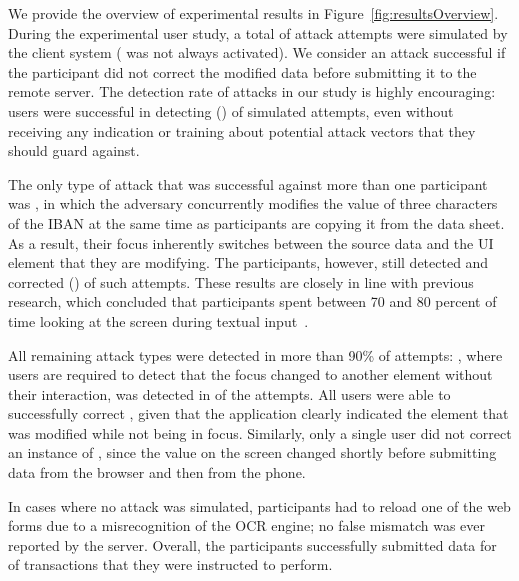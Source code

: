 We provide the overview of experimental results in Figure~\ref{fig:resultsOverview}. During the experimental user study, a total of  attack attempts were simulated by the client system ( was not always activated).
We consider an attack successful if the participant did not correct the modified data before submitting it to the remote server.
The detection rate of attacks in our study is highly encouraging: users were successful in detecting  () of simulated attempts, even without receiving any indication or training about potential attack vectors that they should guard against.

The only type of attack that was successful against more than one participant was , in which the adversary concurrently modifies the value of three characters of the IBAN at the same time as participants are copying it from the data sheet.
As a result, their focus inherently switches between the source data and the UI element that they are modifying.
The participants, however, still detected and corrected  () of such attempts.
These results are closely in line with previous research, which concluded that participants spent between 70 and 80 percent of time looking at the screen during textual input~\cite{howWeType}.

All remaining attack types were detected in more than 90\% of attempts:
, where users are required to detect that the focus changed to another element without their interaction, was detected in  of the attempts.
All users were able to successfully correct , given that the application clearly indicated the element that was modified while not being in focus.
Similarly, only a single user did not correct an instance of , since the value on the screen changed shortly before submitting data from the browser and then from the phone.


In cases where no attack was simulated,  participants had to reload one of the web forms due to a misrecognition of the OCR engine; no false mismatch was ever reported by the server.
Overall, the participants successfully submitted data for  of transactions that they were instructed to perform.


